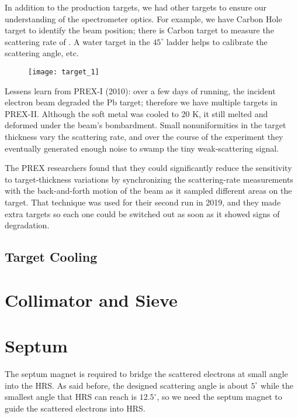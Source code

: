In addition to the production targets, we had other targets to ensure our 
understanding of the spectrometer optics. For example, we have Carbon Hole target
to identify the beam position; there is Carbon target to measure the scattering
rate of \C. A water target in the $45^\circ$ ladder helps to calibrate the 
scattering angle, etc.

\begin{figure}[h!]
    \centering
    \texttt{[image: target\_1]}
\end{figure}

Lessens learn from PREX-I (2010): over a few days of running, the incident
electron beam degraded the Pb target; therefore we have multiple targets in
PREX-II. Although the soft metal was cooled to 20 K, it still melted and 
deformed under the beam's bombardment. Small nonuniformities in the target 
thickness vary the scattering rate, and over the course of the experiment they 
eventually generated enough noise to swamp the tiny weak-scattering signal.

The PREX researchers found that they could significantly reduce the sensitivity 
to target-thickness variations by synchronizing the scattering-rate measurements 
with the back-and-forth motion of the beam as it sampled different areas on the target. 
That technique was used for their second run in 2019, and they made extra targets 
so each one could be switched out as soon as it showed signs of degradation.

\subsection{Target Cooling}

\section{Collimator and Sieve}

\section{Septum}
The septum magnet is required to bridge the scattered electrons at small angle
into the HRS. As said before, the designed scattering angle is about $5^\circ$
while the smallest angle that HRS can reach is $12.5^\circ$, so we need the septum
magnet to guide the scattered electrons into HRS. 

